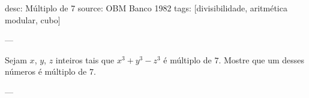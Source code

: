 desc: Múltiplo de 7
source:  OBM Banco 1982
tags:  [divisibilidade, aritmética modular, cubo]

---

Sejam $x$, $y$, $z$ inteiros tais que $x^3 + y^3 - z^3$ é múltiplo de $7$. Mostre que um desses números é múltiplo de $7$.

---

